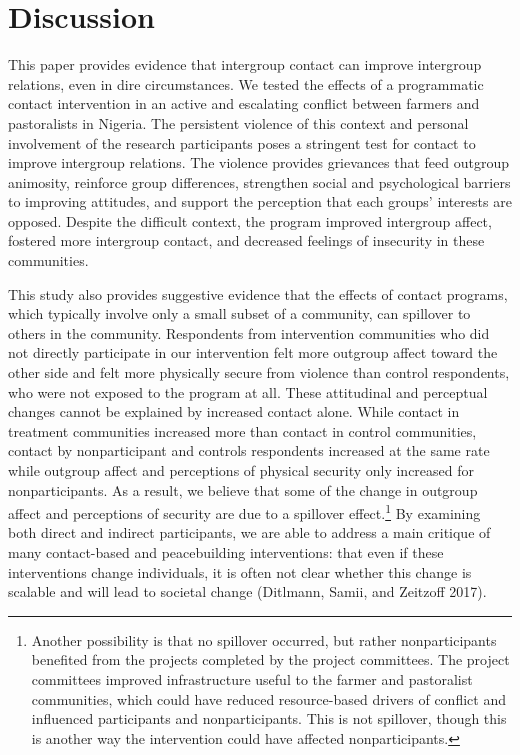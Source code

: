 \documentclass[11pt]{article}
\begin{document}
\hypertarget{discussion}{%
\section{Discussion}\label{discussion}}

This paper provides evidence that intergroup contact can improve
intergroup relations, even in dire circumstances. We tested the effects
of a programmatic contact intervention in an active and escalating
conflict between farmers and pastoralists in Nigeria. The persistent
violence of this context and personal involvement of the research
participants poses a stringent test for contact to improve intergroup
relations. The violence provides grievances that feed outgroup
animosity, reinforce group differences, strengthen social and
psychological barriers to improving attitudes, and support the
perception that each groups' interests are opposed. Despite the
difficult context, the program improved intergroup affect, fostered more
intergroup contact, and decreased feelings of insecurity in these
communities.

This study also provides suggestive evidence that the effects of contact
programs, which typically involve only a small subset of a community,
can spillover to others in the community. Respondents from intervention
communities who did not directly participate in our intervention felt
more outgroup affect toward the other side and felt more physically
secure from violence than control respondents, who were not exposed to
the program at all. These attitudinal and perceptual changes cannot be
explained by increased contact alone. While contact in treatment
communities increased more than contact in control communities, contact
by nonparticipant and controls respondents increased at the same rate
while outgroup affect and perceptions of physical security only
increased for nonparticipants. As a result, we believe that some of the
change in outgroup affect and perceptions of security are due to a
spillover effect.\footnote{Another possibility is that no spillover
  occurred, but rather nonparticipants benefited from the projects
  completed by the project committees. The project committees improved
  infrastructure useful to the farmer and pastoralist communities, which
  could have reduced resource-based drivers of conflict and influenced
  participants and nonparticipants. This is not spillover, though this
  is another way the intervention could have affected nonparticipants.}
By examining both direct and indirect participants, we are able to
address a main critique of many contact-based and peacebuilding
interventions: that even if these interventions change individuals, it
is often not clear whether this change is scalable and will lead to
societal change (Ditlmann, Samii, and Zeitzoff 2017).
\end{document}
